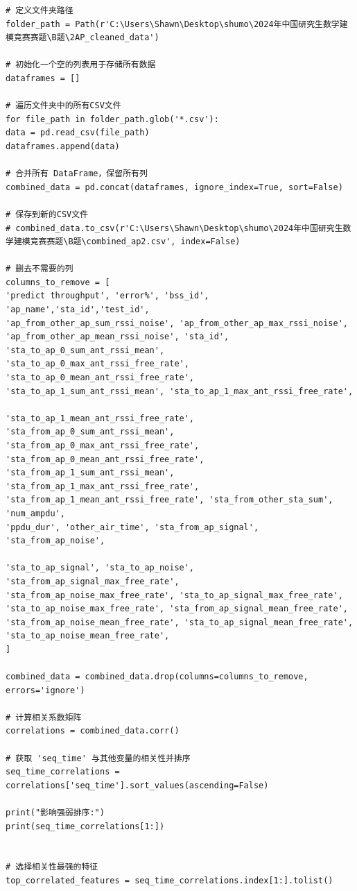 \documentclass[bwprint]{gmcmthesis}
\begin{document}
\begin{lstlisting}
# 定义文件夹路径
folder_path = Path(r'C:\Users\Shawn\Desktop\shumo\2024年中国研究生数学建模竞赛赛题\B题\2AP_cleaned_data')

# 初始化一个空的列表用于存储所有数据
dataframes = []

# 遍历文件夹中的所有CSV文件
for file_path in folder_path.glob('*.csv'):
data = pd.read_csv(file_path)
dataframes.append(data)

# 合并所有 DataFrame，保留所有列
combined_data = pd.concat(dataframes, ignore_index=True, sort=False)

# 保存到新的CSV文件
# combined_data.to_csv(r'C:\Users\Shawn\Desktop\shumo\2024年中国研究生数学建模竞赛赛题\B题\combined_ap2.csv', index=False)

# 删去不需要的列
columns_to_remove = [
'predict throughput', 'error%', 'bss_id', 'ap_name','sta_id','test_id',
'ap_from_other_ap_sum_rssi_noise', 'ap_from_other_ap_max_rssi_noise',
'ap_from_other_ap_mean_rssi_noise', 'sta_id', 'sta_to_ap_0_sum_ant_rssi_mean',
'sta_to_ap_0_max_ant_rssi_free_rate', 'sta_to_ap_0_mean_ant_rssi_free_rate',
'sta_to_ap_1_sum_ant_rssi_mean', 'sta_to_ap_1_max_ant_rssi_free_rate',

'sta_to_ap_1_mean_ant_rssi_free_rate', 'sta_from_ap_0_sum_ant_rssi_mean',
'sta_from_ap_0_max_ant_rssi_free_rate', 'sta_from_ap_0_mean_ant_rssi_free_rate',
'sta_from_ap_1_sum_ant_rssi_mean', 'sta_from_ap_1_max_ant_rssi_free_rate',
'sta_from_ap_1_mean_ant_rssi_free_rate', 'sta_from_other_sta_sum', 'num_ampdu',
'ppdu_dur', 'other_air_time', 'sta_from_ap_signal', 'sta_from_ap_noise',

'sta_to_ap_signal', 'sta_to_ap_noise', 'sta_from_ap_signal_max_free_rate',
'sta_from_ap_noise_max_free_rate', 'sta_to_ap_signal_max_free_rate',
'sta_to_ap_noise_max_free_rate', 'sta_from_ap_signal_mean_free_rate',
'sta_from_ap_noise_mean_free_rate', 'sta_to_ap_signal_mean_free_rate',
'sta_to_ap_noise_mean_free_rate',
]

combined_data = combined_data.drop(columns=columns_to_remove, errors='ignore')

# 计算相关系数矩阵
correlations = combined_data.corr()

# 获取 'seq_time' 与其他变量的相关性并排序
seq_time_correlations = correlations['seq_time'].sort_values(ascending=False)

print("影响强弱排序:")
print(seq_time_correlations[1:])


# 选择相关性最强的特征
top_correlated_features = seq_time_correlations.index[1:].tolist()


\end{lstlisting}
\end{document}
